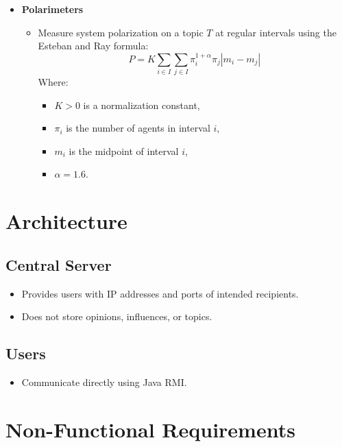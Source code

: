 \documentclass[a4paper,12pt]{article}
\begin{document}
\begin{itemize}
    \item \textbf{Polarimeters}  
    \begin{itemize}
        \item Measure system polarization on a topic \( T \) at regular intervals using the Esteban and Ray formula:  
        \[
        P = K \sum_{i \in I} \sum_{j \in I} \pi_i^{1+\alpha} \pi_j |m_i - m_j|
        \]
        Where:  
        \begin{itemize}
            \item \( K > 0 \) is a normalization constant,  
            \item \( \pi_i \) is the number of agents in interval \( i \),  
            \item \( m_i \) is the midpoint of interval \( i \),  
            \item \( \alpha = 1.6 \).  
        \end{itemize}
    \end{itemize}
\end{itemize}

\section*{Architecture}

\subsection*{Central Server}
\begin{itemize}
    \item Provides users with IP addresses and ports of intended recipients.  
    \item Does not store opinions, influences, or topics.  
\end{itemize}

\subsection*{Users}
\begin{itemize}
    \item Communicate directly using Java RMI.  
\end{itemize}

\section*{Non-Functional Requirements}
\end{document}
